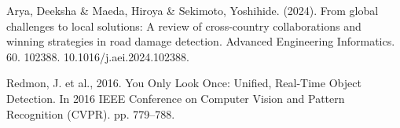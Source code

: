 \begin{thebibliography}{10}
        Arya, Deeksha \& Maeda, Hiroya \& Sekimoto, Yoshihide. (2024). From global challenges to local solutions: A review of cross-country collaborations and winning strategies in road damage detection. Advanced Engineering Informatics. 60. 102388. 10.1016/j.aei.2024.102388. 

        Redmon, J. et al., 2016. You Only Look Once: Unified, Real-Time Object Detection. In 2016 IEEE Conference on Computer Vision and Pattern Recognition (CVPR). pp. 779–788.

  \end{thebibliography}
  